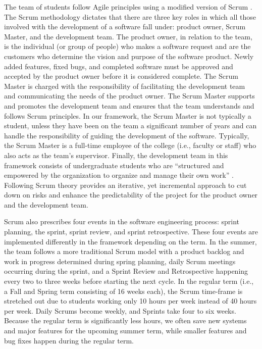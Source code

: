 The team of students follow Agile principles \cite{agilemanifesto} using a modified version of Scrum \cite{thescrumguide}. The Scrum methodology dictates that there are three key roles in which all those involved with the development of a software fall under: product owner, Scrum Master, and the development team. The product owner, in relation to the team, is the individual (or group of people) who makes a software request and are the customers who determine the vision and purpose of the software product. Newly added features, fixed bugs, and completed software must be approved and accepted by the product owner before it is considered complete. The Scrum Master is charged with the responsibility of facilitating the development team and communicating the needs of the product owner. The Scrum Master supports and promotes the development team and ensures that the team understands and follows Scrum principles. In our framework, the Scrum Master is not typically a student, unless they have been on the team a significant number of years and can handle the responsibility of guiding the development of the software. Typically, the Scrum Master is a full-time employee of the college (i.e., faculty or staff) who also acts as the team's supervisor. Finally, the development team in this framework consists of undergraduate students who are ``structured and empowered by the organization to organize and manage their own work'' \cite{thescrumguide}. Following Scrum theory provides an iterative, yet incremental approach to cut down on risks and enhance the predictability of the project for the product owner and the development team. 

Scrum also prescribes four events in the software engineering process: sprint planning, the sprint, sprint review, and sprint retrospective. These four events are implemented differently in the framework depending on the term. In the summer, the team follows a more traditional Scrum model with a product backlog and work in progress determined during spring planning, daily Scrum meetings occurring during the sprint, and a Sprint Review and Retrospective happening every two to three weeks before starting the next cycle. In the regular term (i.e., a Fall and Spring term consisting of 16 weeks each), the Scrum time-frame is stretched out due to students working only 10 hours per week instead of 40 hours per week. Daily Scrums become weekly, and Sprints take four to six weeks. Because the regular term is significantly less hours, we often save new systems and major features for the upcoming summer term, while smaller features and bug fixes happen during the regular term. 

